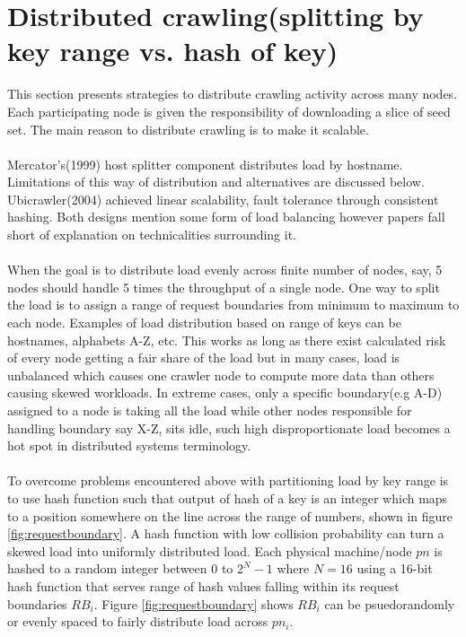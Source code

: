 \section{Distributed crawling(splitting by key range vs. hash of key)}\label{distcrawl}
This section presents strategies to distribute crawling activity across many nodes. Each participating
node is given the responsibility of downloading a slice of seed set. The main reason to distribute
crawling is to make it scalable.  
\\
\\
Mercator's\cite{mercator}(1999) host splitter component distributes load by hostname. Limitations of this way of distribution and alternatives are discussed below. Ubicrawler\cite{ubicrawler}(2004) achieved linear scalability, fault tolerance through consistent hashing\cite{consisthash}. Both designs mention some form of
load balancing however papers fall short of explanation on technicalities surrounding it.
\\
\\
When the goal is to distribute load evenly across finite number of nodes, say, 5 nodes should handle 5 times the throughput
of a single node. One way to split the load is to assign a range of request boundaries from minimum to
maximum to each node. Examples of load distribution based on range of keys can be hostnames, alphabets A-Z, etc. This works
as long as there exist calculated risk of every node getting a fair share of the load but in many cases,
load is unbalanced which causes one crawler node to compute more data than others causing skewed
workloads\cite{consisthash}. In extreme cases, only a specific boundary(e.g A-D) assigned to a node is taking all the load while other nodes responsible for handling boundary say X-Z, sits idle, such high disproportionate load becomes a hot spot\cite{consisthash} in distributed systems terminology.
\\
\\
To overcome problems encountered above with partitioning load by key range is to use hash function such that output of hash of a key is an integer which maps to a position somewhere on the line across the range of
numbers, shown in figure \ref{fig:requestboundary}. A hash function with low collision probability can
turn a skewed load into uniformly distributed load. Each physical machine/node $pn$ is hashed to a random integer between $0$ to $2^N-1$ where $N=16$ using a 16-bit hash function that serves range of hash values falling
within its request boundaries $RB_i$. Figure \ref{fig:requestboundary} shows $RB_i$ can be psuedorandomly or evenly spaced to fairly distribute load across $pn_i$.

